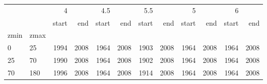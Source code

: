 \begin{tabular}{llrrrrrrrrrr}
\toprule
     &      &     4 &       &   4.5 &       &   5.5 &       &     5 &       &     6 &       \\
     &      & start &   end & start &   end & start &   end & start &   end & start &   end \\
\midrule
zmin & zmax &       &       &       &       &       &       &       &       &       &       \\
0   & 25  &  1994 &  2008 &  1964 &  2008 &  1903 &  2008 &  1964 &  2008 &  1964 &  2008 \\
25  & 70  &  1990 &  2008 &  1964 &  2008 &  1902 &  2008 &  1964 &  2008 &  1964 &  2008 \\
70  & 180 &  1996 &  2008 &  1964 &  2008 &  1914 &  2008 &  1964 &  2008 &  1964 &  2008 \\
\bottomrule
\end{tabular}
